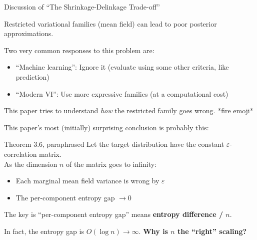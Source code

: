 \documentclass[8pt]{beamer}\usepackage[]{graphicx}\usepackage[]{color}
\begin{document}

\begin{frame}{Discussion of ``The Shrinkage-Delinkage Trade-off''}

Restricted variational families (mean field) can lead to poor posterior approximations.

Two very common responses to this problem are:
%
\begin{itemize}
\item ``Machine learning'': Ignore it (evaluate using some other criteria, like prediction)
\item ``Modern VI'': Use more expressive families (at a computational cost)
\end{itemize}
%
This paper tries to understand \emph{how} the restricted family goes wrong.  *fire emoji*

\pause
\hrulefill

This paper's most (initially) surprising conclusion is probably this:

\begin{block}{Theorem 3.6, paraphrased}
%
Let the target distribution have the constant $\varepsilon$-correlation matrix.\\
As the dimension $n$ of the matrix goes to infinity:
%
\begin{itemize}
\item Each marginal mean field variance is wrong by $\varepsilon$
\item The per-component entropy gap $\rightarrow 0$
\end{itemize}
%
\end{block}


\pause
The key is ``per-component entropy gap'' means \textbf{entropy difference / $n$}.


In fact, the entropy gap is $O(\log n) \rightarrow \infty$.
\textbf{Why is $n$ the ``right'' scaling?}
%
%


\end{frame}
\end{document}
